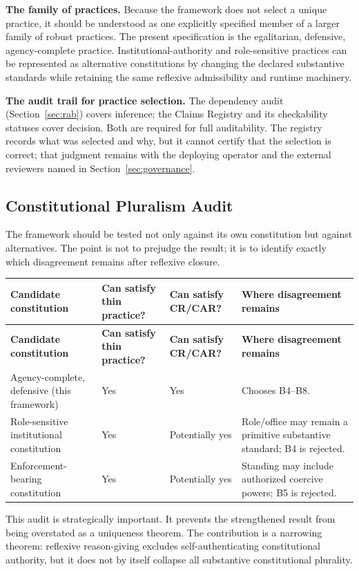 \documentclass[11pt]{article}
\def\ensuremath#1{#1}%
\def\mathrm#1{#1}%
\newcommand{\CR}{\ensuremath{\mathrm{CR}}}
\newcommand{\CAR}{\ensuremath{\mathrm{CAR}}}
\begin{document}
\textbf{The family of practices.} Because the framework does not select a unique practice, it should be understood as one explicitly specified member of a larger family of robust practices. The present specification is the egalitarian, defensive, agency-complete practice. Institutional-authority and role-sensitive practices can be represented as alternative constitutions by changing the declared substantive standards while retaining the same reflexive admissibility and runtime machinery.

\textbf{The audit trail for practice selection.} The dependency audit (Section~\ref{sec:rab}) covers inference; the Claims Registry and its checkability statuses cover decision. Both are required for full auditability. The registry records what was selected and why, but it cannot certify that the selection is correct; that judgment remains with the deploying operator and the external reviewers named in Section~\ref{sec:governance}.

\subsection{Constitutional Pluralism Audit}
The framework should be tested not only against its own constitution but against alternatives. The point is not to prejudge the result; it is to identify exactly which disagreement remains after reflexive closure.

\begin{longtable}{@{}L{3.1cm} L{3.5cm} L{3.8cm} L{4.4cm}@{}}
\toprule
\textbf{Candidate constitution} & \textbf{Can satisfy thin practice?} & \textbf{Can satisfy \CR{}/\CAR{}?} & \textbf{Where disagreement remains} \\
\midrule
\endfirsthead
\toprule
\textbf{Candidate constitution} & \textbf{Can satisfy thin practice?} & \textbf{Can satisfy \CR{}/\CAR{}?} & \textbf{Where disagreement remains} \\
\midrule
\endhead
\bottomrule
\endfoot
Agency-complete, defensive (this framework) & Yes & Yes & Chooses B4--B8. \\
Role-sensitive institutional constitution & Yes & Potentially yes & Role/office may remain a primitive substantive standard; B4 is rejected. \\
Enforcement-bearing constitution & Yes & Potentially yes & Standing may include authorized coercive powers; B5 is rejected. \\
\end{longtable}

This audit is strategically important. It prevents the strengthened result from being overstated as a uniqueness theorem. The contribution is a narrowing theorem: reflexive reason-giving excludes self-authenticating constitutional authority, but it does not by itself collapse all substantive constitutional plurality.
\end{document}
